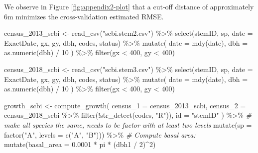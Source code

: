 \documentclass[12pt]{article}
\newenvironment{Shaded}{\begin{snugshade}}{\end{snugshade}}
\newcommand{\AttributeTok}[1]{\textcolor[rgb]{0.77,0.63,0.00}{#1}}
\newcommand{\CommentTok}[1]{\textcolor[rgb]{0.56,0.35,0.01}{\textit{#1}}}
\newcommand{\DecValTok}[1]{\textcolor[rgb]{0.00,0.00,0.81}{#1}}
\newcommand{\FloatTok}[1]{\textcolor[rgb]{0.00,0.00,0.81}{#1}}
\newcommand{\FunctionTok}[1]{\textcolor[rgb]{0.00,0.00,0.00}{#1}}
\newcommand{\NormalTok}[1]{#1}
\newcommand{\OtherTok}[1]{\textcolor[rgb]{0.56,0.35,0.01}{#1}}
\newcommand{\SpecialCharTok}[1]{\textcolor[rgb]{0.00,0.00,0.00}{#1}}
\newcommand{\StringTok}[1]{\textcolor[rgb]{0.31,0.60,0.02}{#1}}
\begin{document}
We observe in Figure \ref{fig:appendix2-plot} that a cut-off distance of
approximately 6m minimizes the cross-validation estimated RMSE.

\begin{Shaded}
\begin{Highlighting}[]
\NormalTok{census\_2013\_scbi }\OtherTok{\textless{}{-}} \FunctionTok{read\_csv}\NormalTok{(}\StringTok{"scbi.stem2.csv"}\NormalTok{) }\SpecialCharTok{\%\textgreater{}\%}
  \FunctionTok{select}\NormalTok{(stemID, sp, }\AttributeTok{date =}\NormalTok{ ExactDate, gx, gy, dbh, codes, status) }\SpecialCharTok{\%\textgreater{}\%}
  \FunctionTok{mutate}\NormalTok{(}
    \AttributeTok{date =} \FunctionTok{mdy}\NormalTok{(date),}
    \AttributeTok{dbh =} \FunctionTok{as.numeric}\NormalTok{(dbh) }\SpecialCharTok{/} \DecValTok{10}
\NormalTok{  ) }\SpecialCharTok{\%\textgreater{}\%}
  \FunctionTok{filter}\NormalTok{(gx }\SpecialCharTok{\textless{}} \DecValTok{400}\NormalTok{, gy }\SpecialCharTok{\textless{}} \DecValTok{400}\NormalTok{)}

\NormalTok{census\_2018\_scbi }\OtherTok{\textless{}{-}} \FunctionTok{read\_csv}\NormalTok{(}\StringTok{"scbi.stem3.csv"}\NormalTok{) }\SpecialCharTok{\%\textgreater{}\%}
  \FunctionTok{select}\NormalTok{(stemID, sp, }\AttributeTok{date =}\NormalTok{ ExactDate, gx, gy, dbh, codes, status) }\SpecialCharTok{\%\textgreater{}\%}
  \FunctionTok{mutate}\NormalTok{(}
    \AttributeTok{date =} \FunctionTok{mdy}\NormalTok{(date),}
    \AttributeTok{dbh =} \FunctionTok{as.numeric}\NormalTok{(dbh) }\SpecialCharTok{/} \DecValTok{10}
\NormalTok{  ) }\SpecialCharTok{\%\textgreater{}\%}
  \FunctionTok{filter}\NormalTok{(gx }\SpecialCharTok{\textless{}} \DecValTok{400}\NormalTok{, gy }\SpecialCharTok{\textless{}} \DecValTok{400}\NormalTok{)}

\NormalTok{growth\_scbi }\OtherTok{\textless{}{-}}
  \FunctionTok{compute\_growth}\NormalTok{(}
    \AttributeTok{census\_1 =}\NormalTok{ census\_2013\_scbi,}
    \AttributeTok{census\_2 =}\NormalTok{ census\_2018\_scbi }\SpecialCharTok{\%\textgreater{}\%} \FunctionTok{filter}\NormalTok{(}\SpecialCharTok{!}\FunctionTok{str\_detect}\NormalTok{(codes, }\StringTok{"R"}\NormalTok{)),}
    \AttributeTok{id =} \StringTok{"stemID"}
\NormalTok{  ) }\SpecialCharTok{\%\textgreater{}\%}
  \CommentTok{\# make all species the same, needs to be factor with at least two levels}
  \FunctionTok{mutate}\NormalTok{(}\AttributeTok{sp =} \FunctionTok{factor}\NormalTok{(}\StringTok{"A"}\NormalTok{, }\AttributeTok{levels =} \FunctionTok{c}\NormalTok{(}\StringTok{"A"}\NormalTok{, }\StringTok{"B"}\NormalTok{))) }\SpecialCharTok{\%\textgreater{}\%}
  \CommentTok{\# Compute basal area:}
  \FunctionTok{mutate}\NormalTok{(}\AttributeTok{basal\_area =} \FloatTok{0.0001} \SpecialCharTok{*}\NormalTok{ pi }\SpecialCharTok{*}\NormalTok{ (dbh1 }\SpecialCharTok{/} \DecValTok{2}\NormalTok{)}\SpecialCharTok{\^{}}\DecValTok{2}\NormalTok{)}


\end{Highlighting}
\end{Shaded}
\end{document}
